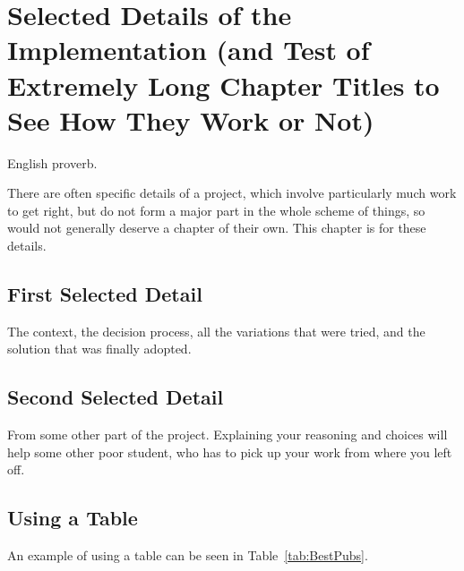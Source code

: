 %
%
% 
% 
% 

\chapter{Selected Details of the Implementation
(and Test of Extremely
Long Chapter Titles to See How They Work or Not)
}

\label{chap:SelectedDetails}


{
English proverb.
}


There are often specific details of a project, which involve
particularly much work to get right, but do not form a major part in
the whole scheme of things, so would not generally deserve a chapter
of their own. This chapter is for these details.



\section{First Selected Detail}

The context, the decision process, all the variations that were tried,
and the solution that was finally adopted.



\section{Second Selected Detail}

From some other part of the project. Explaining your reasoning and
choices will help some other poor student, who has to pick up your
work from where you left off.



\section{Using a Table}

An example of using a table can be seen in Table~\ref{tab:BestPubs}.

